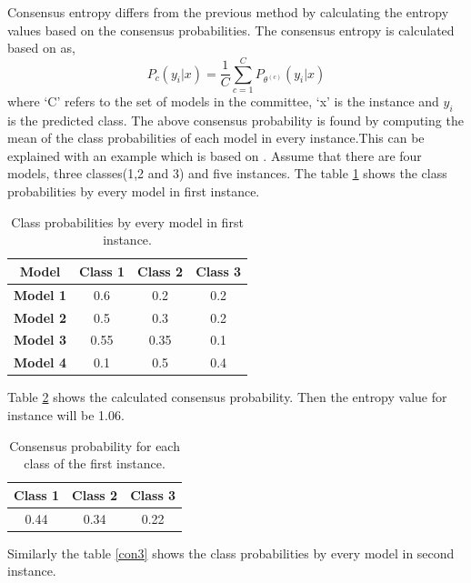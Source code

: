 Consensus entropy differs from the previous method by calculating the entropy values based on the consensus probabilities. The consensus entropy is calculated based on \cite{Settles2010} as, 
\begin{equation} 
P_c(y_i|x) = \frac{1}{C} \sum_{c=1}^{C} P_{\theta^(c)}(y_i|x)
\end{equation}  
where ‘C’ refers to the set of models in the committee, ‘x’ is the instance and $y_i$ is the predicted class. The above consensus probability is found by computing the mean of the class probabilities of each model in every instance.This can be explained with an example which is based on \cite{modal_disagree}.
Assume that there are four models, three classes(1,2 and 3) and five instances. The table \ref{con1} shows the class probabilities by every model in first instance.
\begin{table}[h!]
	\centering
	\begin{tabular}{|c|c|c|c|}
		\hline
		\textbf{Model}   & \textbf{Class 1} & \textbf{Class 2} & \textbf{Class 3} \\ \hline
		\textbf{Model 1} & 0.6              & 0.2              & 0.2              \\ \hline
		\textbf{Model 2} & 0.5              & 0.3              & 0.2              \\ \hline
		\textbf{Model 3} & 0.55             & 0.35             & 0.1              \\ \hline
		\textbf{Model 4} & 0.1              & 0.5              & 0.4              \\ \hline
	\end{tabular}
	\caption{Class probabilities by every model in first instance.}
	\label{con1}
\end{table}
Table \ref{con2} shows the calculated consensus probability. Then the entropy value for instance will be 1.06.
\begin{table}[h!]
	\centering
	\begin{tabular}{|c|c|c|}
		\hline
		\textbf{Class 1} & \textbf{Class 2} & \textbf{Class 3} \\ \hline
		0.44             & 0.34             & 0.22             \\ \hline
	\end{tabular}
	\caption{Consensus probability for each class of the first instance.}
	\label{con2}
\end{table}
Similarly the table \ref{con3} shows the class probabilities by every model in second instance. 
